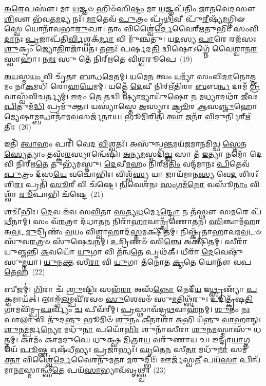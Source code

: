 \-\ul{𑌅}\-\-\ul{𑌰𑍇}\-𑌪𑌸𑍗॑। 𑌮𑌾 \ul{𑌯}\-𑌜𑍍𑌞𑍞 𑌹𑌿𑍞᳴𑌸𑌿\-\ul{𑌷𑍍𑌟𑌂} 𑌮𑌾 \ul{𑌯}\-𑌜𑍍𑌞𑌪᳴𑌤𑌿𑌂 𑌜𑌾𑌤𑌵𑍇𑌦𑌸𑍗 \ul{𑌶𑌿}\-𑌵𑍗 𑌭᳴𑌵𑌤\-\ul{𑌮}\-𑌦𑍍𑌯 𑌨𑌃᳴। \ul{𑌮𑌾}\-𑌤𑍇𑌵᳴ \ul{𑌪𑍁}\-𑌤𑍍𑌰𑌂 𑌪𑍃᳴\-\ul{𑌥𑌿}\-𑌵𑍀 𑌪𑍁᳴\-\ul{𑌰𑍀}\-𑌷𑍍𑌯᳴\-\ul{𑌮}\-𑌗𑍍𑌨𑌿𑍟 𑌸𑍍𑌵𑍇 𑌯𑍋𑌨𑌾᳴𑌵𑌭𑌾\-\ul{𑌰𑍁}\-𑌖𑌾। 𑌤𑌾𑌂 𑌵𑌿𑌶𑍍𑌵𑍈॑\-\ul{𑌰𑍍𑌦𑍇}\-𑌵𑍈𑌰𑍍\mbox{}\-\ul{𑌋}\-𑌤𑍁𑌭𑌿𑌃᳴ 𑌸𑌂𑌵𑌿\-\ul{𑌦𑌾}\-𑌨𑌃 \ul{𑌪𑍍𑌰}\-𑌜𑌾𑌪᳴𑌤𑌿\-\ul{𑌰𑍍𑌵𑌿}\-𑌶𑍍𑌵𑌕᳴\-\ul{𑌰𑍍𑌮𑌾} 𑌵𑌿 𑌮𑍁᳴𑌞𑍍𑌚𑌤𑍁। 𑌯\-\ul{𑌦}\-𑌸𑍍𑌯 \ul{𑌪𑌾}\-𑌰𑍇 𑌰𑌜᳴𑌸𑌃 \ul{𑌶𑍁}\-𑌕𑍍𑌰𑌂 𑌜𑍍𑌯𑍋\-\ul{𑌤𑌿}\-𑌰𑌜𑌾᳴𑌯𑌤। 𑌤𑌨𑍍𑌨𑌃᳴ 𑌪𑌰𑍍\mbox{}\-\ul{𑌷}\-𑌦\-\ul{𑌤𑌿} 𑌦𑍍𑌵𑌿𑌷𑍋\-𑌽𑌗𑍍𑌨𑍇᳴ 𑌵𑍈𑌶𑍍𑌵𑌾𑌨\-\ul{𑌰} 𑌸𑍍𑌵𑌾𑌹𑌾॑। 𑌨\-\ul{𑌮𑌃} 𑌸𑍁 𑌤𑍇᳴ 𑌨𑌿𑌰𑍍\mbox{}𑌋𑌤𑍇 𑌵𑌿𑌶𑍍𑌵𑌰𑍂𑌪𑍇~(19)

\-\ul{𑌅}\-\-\ul{𑌯}\-𑌸𑍍𑌮\-\ul{𑌯𑌂} 𑌵𑌿 𑌚𑍃᳴𑌤𑌾 \ul{𑌬}\-𑌨𑍍𑌧\-\ul{𑌮𑍇}\-𑌤𑌮𑍍। \ul{𑌯}\-𑌮𑍇\-\ul{𑌨} 𑌤𑍍𑌵𑌂 \ul{𑌯}\-𑌮𑍍𑌯𑌾᳴ 𑌸𑌂𑌵𑌿\-\ul{𑌦𑌾}\-𑌨𑍋\-\ul{𑌤𑍍𑌤}\-𑌮𑌂 𑌨𑌾\-\ul{𑌕}\-𑌮𑌧𑌿᳴ 𑌰𑍋𑌹\-\ul{𑌯𑍇}\-𑌮𑌮𑍍। 𑌯𑌤𑍍𑌤𑍇᳴ \ul{𑌦𑍇}\-𑌵𑍀 𑌨𑌿𑌰𑍍\mbox{}𑌋᳴𑌤𑌿𑌰𑌾 \ul{𑌬}\-𑌬\-\ul{𑌨𑍍𑌧} 𑌦𑌾𑌮᳴ \ul{𑌗𑍍𑌰𑍀}\-𑌵𑌾𑌸𑍍𑌵᳴𑌵𑌿\-\ul{𑌚}\-𑌰𑍍𑌤𑍍𑌯𑌮𑍍। \ul{𑌇}\-𑌦𑌂 \ul{𑌤𑍇} 𑌤𑌦𑍍𑌵𑌿 \ul{𑌷𑍍𑌯𑌾}\-𑌮𑍍𑌯𑌾𑌯𑍁᳴\-\ul{𑌷𑍋} 𑌨 𑌮\-\ul{𑌧𑍍𑌯𑌾}\-𑌦𑌥𑌾᳴ \ul{𑌜𑍀}\-𑌵𑌃 \ul{𑌪𑌿}\-𑌤𑍁𑌮᳴\-\ul{𑌦𑍍𑌧𑌿} 𑌪𑍍𑌰𑌮𑍁᳴𑌕𑍍𑌤𑌃। 𑌯𑌸𑍍𑌯𑌾॑𑌸𑍍𑌤𑍇 \ul{𑌅}\-𑌸𑍍𑌯𑌾𑌃 \ul{𑌕𑍍𑌰𑍂}\-𑌰 \ul{𑌆}\-𑌸\-\ul{𑌞𑍍𑌜𑍁}\-𑌹𑍋\-\ul{𑌮𑍍𑌯𑍇}\-𑌷𑌾\-\ul{𑌮𑍍𑌬}\-𑌨𑍍𑌧𑌾𑌨𑌾᳴𑌮\-\ul{𑌵}\-𑌸𑌰𑍍𑌜᳴𑌨𑌾𑌯। 𑌭𑍂\-\ul{𑌮𑌿}\-𑌰𑌿𑌤𑌿᳴ \ul{𑌤𑍍𑌵𑌾} 𑌜𑌨𑌾᳴ \ul{𑌵𑌿}\-𑌦𑍁𑌰𑍍𑌨𑌿𑌰𑍍\mbox{}𑌋᳴𑌤𑌿𑌃~(20)

𑌇𑌤𑌿᳴ \ul{𑌤𑍍𑌵𑌾}\-𑌹𑌂 𑌪𑌰𑌿᳴ 𑌵𑍇𑌦 \ul{𑌵𑌿}\-𑌶𑍍𑌵𑌤𑌃᳴। 𑌅𑌸𑍁᳴𑌨𑍍𑌵\-\ul{𑌨𑍍𑌤}\-𑌮𑌯᳴𑌜𑌮𑌾𑌨𑌮𑌿𑌚𑍍𑌛 \ul{𑌸𑍍𑌤𑍇}\-𑌨\-\ul{𑌸𑍍𑌯𑍇}\-𑌤𑍍𑌯𑌾𑌂 𑌤𑌸𑍍𑌕᳴\-\ul{𑌰}\-𑌸𑍍𑌯𑌾𑌨𑍍𑌵𑍇᳴𑌷𑌿। \ul{𑌅}\-𑌨𑍍𑌯\-\ul{𑌮}\-𑌸𑍍𑌮𑌦𑌿᳴\-\ul{𑌚𑍍𑌛} 𑌸𑌾 𑌤᳴ \ul{𑌇}\-𑌤𑍍𑌯𑌾 𑌨𑌮𑍋᳴ 𑌦𑍇𑌵𑌿 𑌨𑌿𑌰𑍍\mbox{}𑌋\-\ul{𑌤𑍇} 𑌤𑍁𑌭𑍍𑌯᳴𑌮𑌸𑍍𑌤𑍁। \ul{𑌦𑍇}\-𑌵𑍀\-\ul{𑌮}\-𑌹𑌂 𑌨𑌿𑌰𑍍\mbox{}𑌋᳴\-\ul{𑌤𑌿𑌂} 𑌵𑌨𑍍𑌦᳴𑌮𑌾𑌨𑌃 \ul{𑌪𑌿}\-𑌤𑍇𑌵᳴ \ul{𑌪𑍁}\-𑌤𑍍𑌰𑌂 𑌦᳴𑌸\-\ul{𑌯𑍇} 𑌵𑌚𑍋᳴𑌭𑌿𑌃। 𑌵𑌿𑌶𑍍𑌵᳴\-\ul{𑌸𑍍𑌯} 𑌯𑌾 𑌜𑌾𑌯᳴𑌮𑌾𑌨\-\ul{𑌸𑍍𑌯} 𑌵𑍇\-\ul{𑌦} 𑌶𑌿𑌰𑌃᳴𑌶𑌿\-\ul{𑌰𑌃} 𑌪𑍍𑌰𑌤𑌿᳴ \ul{𑌸𑍂}\-𑌰𑍀 𑌵𑌿 𑌚᳴𑌷𑍍𑌟𑍇। \ul{𑌨𑌿}\-𑌵𑍇𑌶᳴𑌨𑌃 \ul{𑌸𑌂}\-𑌗𑌮᳴\-\ul{𑌨𑍋} 𑌵𑌸𑍂᳴\-\ul{𑌨𑌾𑌂} 𑌵𑌿𑌶𑍍𑌵𑌾᳴ \ul{𑌰𑍂}\-𑌪𑌾𑌭𑌿 𑌚᳴𑌷𑍍𑌟𑍇~(21)

𑌶𑌚𑍀᳴𑌭𑌿𑌃। \ul{𑌦𑍇}\-𑌵 𑌇᳴𑌵 𑌸\-\ul{𑌵𑌿}\-𑌤𑌾 \ul{𑌸}\-𑌤𑍍𑌯\-\ul{𑌧}\-𑌰𑍍𑌮𑍇\-\ul{𑌨𑍍𑌦𑍍𑌰𑍋} 𑌨 𑌤᳴𑌸𑍍𑌥𑍗 𑌸\-\ul{𑌮}\-𑌰𑍇 𑌪᳴\-\ul{𑌥𑍀}\-𑌨𑌾𑌮𑍍। 𑌸𑌂 𑌵᳴\-\ul{𑌰}\-𑌤𑍍𑌰𑌾 𑌦᳴𑌧𑌾𑌤\-\ul{𑌨} 𑌨𑌿𑌰𑌾᳴\-\ul{𑌹𑌾}\-𑌵𑌾𑌨𑍍𑌕𑍃᳴𑌣𑍋𑌤𑌨। \ul{𑌸𑌿}\-𑌞𑍍𑌚𑌾𑌮᳴𑌹𑌾 𑌅\-\ul{𑌵}\-𑌟\-\ul{𑌮𑍁}\-𑌦𑍍𑌰𑌿𑌣𑌂᳴ \ul{𑌵}\-𑌯𑌂 𑌵𑌿𑌶𑍍𑌵𑌾𑌹𑌾𑌦᳴\-\ul{𑌸𑍍𑌤}\-𑌮𑌕𑍍𑌷𑌿᳴𑌤𑌮𑍍। 𑌨𑌿𑌷𑍍𑌕𑍃᳴𑌤𑌾𑌹𑌾𑌵𑌮\-\ul{𑌵}\-𑌟𑍞 𑌸𑍁᳴𑌵\-\ul{𑌰}\-𑌤𑍍𑌰𑍞 𑌸𑍁᳴𑌷𑍇\-\ul{𑌚}\-𑌨𑌮𑍍। \ul{𑌉}\-𑌦𑍍𑌰𑌿𑌣𑍞᳴ 𑌸𑌿\-\ul{𑌞𑍍𑌚𑍇} 𑌅𑌕𑍍𑌷𑌿᳴𑌤𑌮𑍍। 𑌸𑍀𑌰𑌾᳴ 𑌯𑍁𑌞𑍍𑌜𑌨𑍍𑌤𑌿 \ul{𑌕}\-𑌵𑌯𑍋᳴ \ul{𑌯𑍁}\-𑌗𑌾 𑌵𑌿 𑌤᳴𑌨𑍍𑌵\-\ul{𑌤𑍇} 𑌪𑍃𑌥᳴𑌕𑍍। 𑌧𑍀𑌰𑌾᳴ \ul{𑌦𑍇}\-𑌵𑍇𑌷𑍁᳴ 𑌸𑍁\-\ul{𑌮𑍍𑌨}\-𑌯𑌾। \ul{𑌯𑍁}\-𑌨\-\ul{𑌕𑍍𑌤} 𑌸𑍀\-\ul{𑌰𑌾} 𑌵𑌿 \ul{𑌯𑍁}\-𑌗𑌾 𑌤᳴𑌨𑍋𑌤 \ul{𑌕𑍃}\-𑌤𑍇 𑌯𑍋𑌨𑍗᳴ 𑌵𑌪\-\ul{𑌤𑍇}\-𑌹~(22)

𑌬𑍀𑌜𑌮𑍍॑। \ul{𑌗𑌿}\-𑌰𑌾 𑌚᳴ \ul{𑌶𑍍𑌰𑍁}\-𑌷𑍍𑌟𑌿𑌃 𑌸𑌭᳴\-\ul{𑌰𑌾} 𑌅𑌸᳴\-\ul{𑌨𑍍𑌨𑍋} 𑌨𑍇𑌦𑍀᳴\-\ul{𑌯} 𑌇\-\ul{𑌥𑍍𑌸𑍃}\-𑌣𑍍𑌯𑌾᳴ \ul{𑌪}\-𑌕𑍍𑌵𑌮𑌾𑌯᳴𑌤𑍍। 𑌲𑌾𑌙𑍍𑌗᳴\-\ul{𑌲}\-𑌮𑍍𑌪𑌵𑍀᳴𑌰𑌵𑍞 \ul{𑌸𑍁}\-𑌶𑍇𑌵𑍞᳴ 𑌸𑍁\-\ul{𑌮}\-𑌤𑌿𑌥𑍍𑌸᳴𑌰𑍁। 𑌉𑌦𑌿𑌤𑍍𑌕𑍃᳴𑌷\-\ul{𑌤𑌿} 𑌗𑌾𑌮𑌵𑌿᳴𑌮𑍍𑌪𑍍𑌰\-\ul{𑌫}\-𑌰𑍍𑌵𑍍𑌯𑌂᳴ \ul{𑌚} 𑌪𑍀𑌵᳴𑌰𑍀𑌮𑍍। \ul{𑌪𑍍𑌰}\-𑌸𑍍𑌥𑌾𑌵᳴𑌦𑍍𑌰\-\ul{𑌥}\-𑌵𑌾𑌹᳴𑌨𑌮𑍍। \ul{𑌶𑍁}\-𑌨𑌂 \ul{𑌨𑌃} 𑌫𑌾\-\ul{𑌲𑌾} 𑌵𑌿 𑌤𑍁᳴𑌦\-\ul{𑌨𑍍𑌤𑍁} 𑌭𑍂𑌮𑌿𑍞᳴ \ul{𑌶𑍁}\-𑌨𑌂 \ul{𑌕𑍀}\-𑌨𑌾𑌶𑌾᳴ \ul{𑌅}\-𑌭𑌿 𑌯᳴𑌨𑍍𑌤𑍁 \ul{𑌵𑌾}\-𑌹𑌾𑌨𑍍। \ul{𑌶𑍁}\-𑌨\-\ul{𑌮𑍍𑌪}\-𑌰𑍍𑌜\-\ul{𑌨𑍍𑌯𑍋} 𑌮𑌧𑍁᳴\-\ul{𑌨𑌾} 𑌪𑌯𑍋᳴\-\ul{𑌭𑌿𑌃} 𑌶𑍁𑌨𑌾᳴𑌸𑍀𑌰𑌾 \ul{𑌶𑍁}\-𑌨\-\ul{𑌮}\-𑌸𑍍𑌮𑌾𑌸𑍁᳴ 𑌧𑌤𑍍𑌤𑌮𑍍। 𑌕𑌾𑌮𑌂᳴ 𑌕𑌾𑌮𑌦𑍁𑌘𑍇 𑌧𑍁𑌕𑍍𑌷𑍍𑌵 \ul{𑌮𑌿}\-𑌤𑍍𑌰𑌾\-\ul{𑌯} 𑌵𑌰𑍁᳴𑌣𑌾𑌯 𑌚। 𑌇𑌨𑍍𑌦𑍍𑌰𑌾᳴\-\ul{𑌯𑌾}\-𑌗𑍍𑌨𑌯𑍇᳴ \ul{𑌪𑍂}\-𑌷𑍍𑌣 𑌓𑌷᳴𑌧𑍀𑌭𑍍𑌯𑌃 \ul{𑌪𑍍𑌰}\-𑌜𑌾𑌭𑍍𑌯𑌃᳴। \ul{𑌘𑍃}\-𑌤𑍇\-\ul{𑌨} 𑌸𑍀\-\ul{𑌤𑌾} 𑌮𑌧𑍁᳴\-\ul{𑌨𑌾} 𑌸𑌮᳴\-\ul{𑌕𑍍𑌤𑌾} 𑌵𑌿𑌶𑍍𑌵𑍈॑\-\ul{𑌰𑍍𑌦𑍇}\-𑌵𑍈𑌰𑌨𑍁᳴𑌮𑌤𑌾 \ul{𑌮}\-𑌰𑍁𑌦𑍍𑌭𑌿𑌃᳴। 𑌊𑌰𑍍𑌜᳴𑌸𑍍𑌵\-\ul{𑌤𑍀} 𑌪𑌯᳴\-\ul{𑌸𑌾} 𑌪𑌿𑌨𑍍𑌵᳴𑌮𑌾\-\ul{𑌨𑌾}\-𑌸𑍍𑌮𑌾𑌨𑍍𑌥𑍍𑌸𑍀᳴\-\ul{𑌤𑍇} 𑌪𑌯᳴\-\ul{𑌸𑌾}\-𑌭𑍍𑌯𑌾𑌵᳴𑌵𑍃𑌥𑍍𑌸𑍍𑌵॥~(23)

